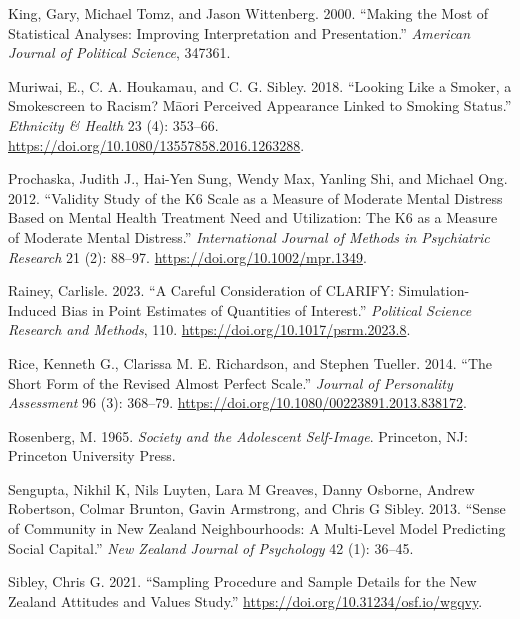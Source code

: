 \documentclass[
  singlecolumn]{report}
\newlength{\cslhangindent}
\newlength{\cslentryspacingunit} %
\newenvironment{CSLReferences}[2] %
 {%
  \setlength{\parindent}{0pt}
  \ifodd #1
  \let\oldpar\par
  \def\par{\hangindent=\cslhangindent\oldpar}
  \fi
  \setlength{\parskip}{#2\cslentryspacingunit}
 }%
 {}
\begin{document}
\begin{CSLReferences}{1}{0}
\leavevmode{}%
King, Gary, Michael Tomz, and Jason Wittenberg. 2000. {``Making the Most
of Statistical Analyses: Improving Interpretation and Presentation.''}
\emph{American Journal of Political Science}, 347361.

\leavevmode{}%
Muriwai, E., C. A. Houkamau, and C. G. Sibley. 2018. {``Looking Like a
Smoker, a Smokescreen to Racism? Māori Perceived Appearance Linked to
Smoking Status.''} \emph{Ethnicity \& Health} 23 (4): 353--66.
\url{https://doi.org/10.1080/13557858.2016.1263288}.

\leavevmode{}%
Prochaska, Judith J., Hai-Yen Sung, Wendy Max, Yanling Shi, and Michael
Ong. 2012. {``Validity Study of the K6 Scale as a Measure of Moderate
Mental Distress Based on Mental Health Treatment Need and Utilization:
The K6 as a Measure of Moderate Mental Distress.''} \emph{International
Journal of Methods in Psychiatric Research} 21 (2): 88--97.
\url{https://doi.org/10.1002/mpr.1349}.

\leavevmode{}%
Rainey, Carlisle. 2023. {``A Careful Consideration of CLARIFY:
Simulation-Induced Bias in Point Estimates of Quantities of Interest.''}
\emph{Political Science Research and Methods}, 110.
\url{https://doi.org/10.1017/psrm.2023.8}.

\leavevmode{}%
Rice, Kenneth G., Clarissa M. E. Richardson, and Stephen Tueller. 2014.
{``The Short Form of the Revised Almost Perfect Scale.''} \emph{Journal
of Personality Assessment} 96 (3): 368--79.
\url{https://doi.org/10.1080/00223891.2013.838172}.

\leavevmode{}%
Rosenberg, M. 1965. \emph{Society and the Adolescent Self-Image}.
Princeton, NJ: Princeton University Press.

\leavevmode{}%
Sengupta, Nikhil K, Nils Luyten, Lara M Greaves, Danny Osborne, Andrew
Robertson, Colmar Brunton, Gavin Armstrong, and Chris G Sibley. 2013.
{``Sense of Community in New Zealand Neighbourhoods: A Multi-Level Model
Predicting Social Capital.''} \emph{New Zealand Journal of Psychology}
42 (1): 36--45.

\leavevmode{}%
Sibley, Chris G. 2021. {``Sampling Procedure and Sample Details for the
New Zealand Attitudes and Values Study.''}
\url{https://doi.org/10.31234/osf.io/wgqvy}.


\end{CSLReferences}
\end{document}
